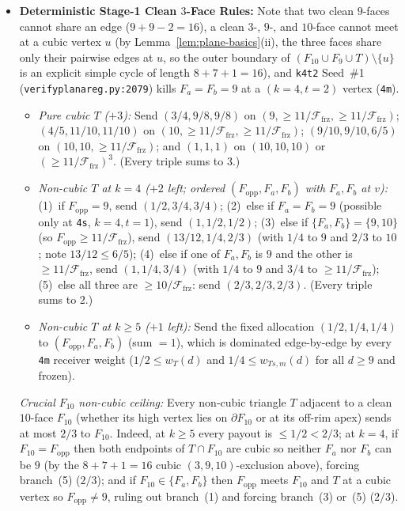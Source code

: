 \documentclass[11pt,reqno]{amsart}
\theoremstyle{plain}
\theoremstyle{definition}
\theoremstyle{remark}
\newcommand{\Ffrz}{\mathcal{F}_{\mathrm{frz}}}
\DeclareRobustCommand{\_}{\ifmmode\text{\textunderscore}\else\textunderscore\allowbreak\fi}
\begin{document}
\begin{itemize}[leftmargin=1.8em]
  \item \textbf{Deterministic Stage-1 Clean $3$-Face Rules:} Note that two clean $9$-faces cannot share an edge ($9+9-2=16$), a clean $3$-, $9$-, and $10$-face cannot meet at a cubic vertex $u$ (by Lemma~\ref{lem:plane-basics}(ii), the three faces share only their pairwise edges at $u$, so the outer boundary of $(F_{10} \cup F_9 \cup T) \setminus \{u\}$ is an explicit simple cycle of length $8 + 7 + 1 = 16$), and \texttt{k4t2} Seed~\#1 (\texttt{verify\_planar\_eg.py:2079}) kills $F_a = F_b = 9$ at a $(k=4, t=2)$ vertex (\texttt{4m}).
  \begin{itemize}[leftmargin=1.5em]
    \item \emph{Pure cubic $T$ ($+3$):} Send $(3/4, 9/8, 9/8)$ on $(9, \ge 11/\Ffrz, \ge 11/\Ffrz)$; $(4/5, 11/10, 11/10)$ on $(10, \ge 11/\Ffrz, \ge 11/\Ffrz)$; $(9/10, 9/10, 6/5)$ on $(10, 10, \ge 11/\Ffrz)$; and $(1, 1, 1)$ on $(10, 10, 10)$ or $(\ge 11/\Ffrz)^3$. (Every triple sums to $3$.)
    \item \emph{Non-cubic $T$ at $k = 4$ ($+2$ left; ordered $(F_{\mathrm{opp}}, F_a, F_b)$ with $F_a, F_b$ at $v$):}
      (1)~if $F_{\mathrm{opp}} = 9$, send $(1/2, 3/4, 3/4)$;
      (2)~else if $F_a = F_b = 9$ (possible only at \texttt{4s}, $k=4, t=1$), send $(1, 1/2, 1/2)$;
      (3)~else if $\{F_a, F_b\} = \{9, 10\}$ (so $F_{\mathrm{opp}} \ge 11/\Ffrz$), send $(13/12, 1/4, 2/3)$ (with $1/4$ to $9$ and $2/3$ to $10$; note $13/12 \le 6/5$);
      (4)~else if one of $F_a, F_b$ is $9$ and the other is $\ge 11/\Ffrz$, send $(1, 1/4, 3/4)$ (with $1/4$ to $9$ and $3/4$ to $\ge 11/\Ffrz$);
      (5)~else all three are $\ge 10/\Ffrz$: send $(2/3, 2/3, 2/3)$. (Every triple sums to $2$.)
    \item \emph{Non-cubic $T$ at $k \ge 5$ ($+1$ left):} Send the fixed allocation $(1/2, 1/4, 1/4)$ to $(F_{\mathrm{opp}}, F_a, F_b)$ (sum $= 1$), which is dominated edge-by-edge by every \texttt{4m} receiver weight ($1/2 \le w_T(d)$ and $1/4 \le w_{Ts,m}(d)$ for all $d \ge 9$ and frozen).
  \end{itemize}
  \emph{Crucial $F_{10}$ non-cubic ceiling:} Every non-cubic triangle $T$ adjacent to a clean $10$-face $F_{10}$ (whether its high vertex lies on $\partial F_{10}$ or at its off-rim apex) sends at most $2/3$ to $F_{10}$. Indeed, at $k \ge 5$ every payout is $\le 1/2 < 2/3$; at $k = 4$, if $F_{10} = F_{\mathrm{opp}}$ then both endpoints of $T \cap F_{10}$ are cubic so neither $F_a$ nor $F_b$ can be $9$ (by the $8+7+1=16$ cubic $(3, 9, 10)$-exclusion above), forcing branch~(5) ($2/3$); and if $F_{10} \in \{F_a, F_b\}$ then $F_{\mathrm{opp}}$ meets $F_{10}$ and $T$ at a cubic vertex so $F_{\mathrm{opp}} \neq 9$, ruling out branch~(1) and forcing branch~(3) or~(5) ($2/3$).


\end{itemize}
\end{document}
